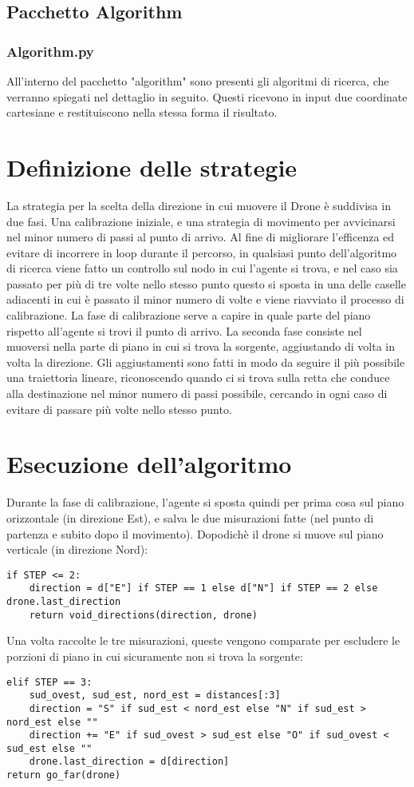 \subsection{Pacchetto Algorithm}

\subsubsection{Algorithm.py}
All'interno del pacchetto "algorithm" sono presenti gli algoritmi di ricerca, che verranno spiegati nel dettaglio in seguito. Questi ricevono in input due coordinate cartesiane e restituiscono nella stessa forma il risultato.
	
\section{Definizione delle strategie}
La strategia per la scelta della direzione in cui muovere il Drone è suddivisa in due fasi. Una calibrazione iniziale, e una strategia di movimento per avvicinarsi nel minor numero di passi al punto di arrivo. Al fine di migliorare l'efficenza ed evitare di incorrere in loop durante il percorso, in qualsiasi punto dell'algoritmo di ricerca viene fatto un controllo sul nodo in cui l'agente si trova, e nel caso sia passato per più di tre volte nello stesso punto questo si sposta in una delle caselle adiacenti in cui è passato il minor numero di volte e viene riavviato il processo di calibrazione.
La fase di calibrazione serve a capire in quale parte del piano rispetto all'agente si trovi il punto di arrivo. 
La seconda fase consiste nel muoversi nella parte di piano in cui si trova la sorgente, aggiustando di volta in volta la direzione. Gli aggiustamenti sono fatti in modo da seguire il più possibile una traiettoria lineare, riconoscendo quando ci si trova sulla retta che conduce alla destinazione nel minor numero di passi possibile, cercando in ogni caso di evitare di passare più volte nello stesso punto.
	
\section{Esecuzione dell'algoritmo}
Durante la fase di calibrazione, l'agente si sposta quindi per prima cosa sul piano orizzontale (in direzione Est), e salva le due misurazioni fatte (nel punto di partenza e subito dopo il movimento). Dopodichè il drone si muove sul piano verticale (in direzione Nord): 
\begin{verbatim}
if STEP <= 2:
    direction = d["E"] if STEP == 1 else d["N"] if STEP == 2 else drone.last_direction
    return void_directions(direction, drone)
\end{verbatim}
Una volta raccolte le tre misurazioni, queste vengono comparate per escludere le porzioni di piano in cui sicuramente non si trova la sorgente:
\begin{verbatim}
elif STEP == 3:
    sud_ovest, sud_est, nord_est = distances[:3]
    direction = "S" if sud_est < nord_est else "N" if sud_est > nord_est else ""
    direction += "E" if sud_ovest > sud_est else "O" if sud_ovest < sud_est else ""
    drone.last_direction = d[direction]
return go_far(drone)
\end{verbatim}


